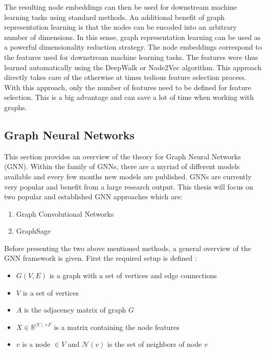 	\noindent The resulting node embeddings can then be used for downstream
	machine learning tasks using standard methods. An additional benefit of 
	graph representation learning is that the nodes can be encoded into an 
	arbitrary number of dimensions. In this sense, graph representation 
	learning can be used as a powerful dimensionality reduction strategy. 
	The node embeddings correspond to the features used for downstream 
	machine learning tasks. The features were thus learned automatically using 
	the DeepWalk or Node2Vec algorithm. This approach directly takes care of the 
	otherwise at times tedious feature selection process. With this approach, 
	only the number of features need to be defined for feature selection. This 
	is a big advantage and can save a lot of time when working with graphs. 

	\subsection{Graph Neural Networks}
	\label{section:GNN_theory}

	This section provides an overview of the theory for Graph Neural Networks
	(GNN). Within the family of GNNs, there are a myriad of different models 
	available and every few months new models are published. GNNs are currently 
	very popular and benefit from a large research output. This thesis will 
	focus on two popular and established GNN approaches which are:

	\begin{enumerate}
		\item Graph Convolutional Networks
		\item GraphSage
	\end{enumerate}
	
	\noindent Before presenting the two above mentioned methods, a general
	overview of the GNN framework is given. First the required setup is
	defined \citep{leskovec2021lecture}:

	\begin{itemize}
		\setlength\itemsep{0.2em}
		\item $G(V,E)$ is a graph with a set of vertices and edge connections
		\item $V$ is a set of vertices
		\item $A$ is the adjacency matrix of graph $G$
		\item $X \in \mathbb{R}^{\mid V\mid \times F}$ is a matrix containing
			the node features
		\item $v$ is a node $\in V$ and $\mathcal{N}(v)$ is the set of 
			neighbors of node $v$
	\end{itemize}

